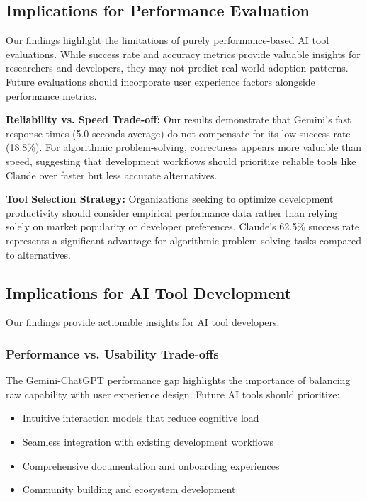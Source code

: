 \documentclass[conference]{IEEEtran}
\begin{document}
\subsection{Implications for Performance Evaluation}

Our findings highlight the limitations of purely performance-based AI tool evaluations. While success rate and accuracy metrics provide valuable insights for researchers and developers, they may not predict real-world adoption patterns. Future evaluations should incorporate user experience factors alongside performance metrics.

\textbf{Reliability vs. Speed Trade-off:} Our results demonstrate that Gemini's fast response times (5.0 seconds average) do not compensate for its low success rate (18.8\%). For algorithmic problem-solving, correctness appears more valuable than speed, suggesting that development workflows should prioritize reliable tools like Claude over faster but less accurate alternatives.

\textbf{Tool Selection Strategy:} Organizations seeking to optimize development productivity should consider empirical performance data rather than relying solely on market popularity or developer preferences. Claude's 62.5\% success rate represents a significant advantage for algorithmic problem-solving tasks compared to alternatives.

\subsection{Implications for AI Tool Development}

Our findings provide actionable insights for AI tool developers:

\subsubsection{Performance vs. Usability Trade-offs}

The Gemini-ChatGPT performance gap highlights the importance of balancing raw capability with user experience design. Future AI tools should prioritize:

\begin{itemize}
    \item Intuitive interaction models that reduce cognitive load
    \item Seamless integration with existing development workflows
    \item Comprehensive documentation and onboarding experiences
    \item Community building and ecosystem development
\end{itemize}
\end{document}
